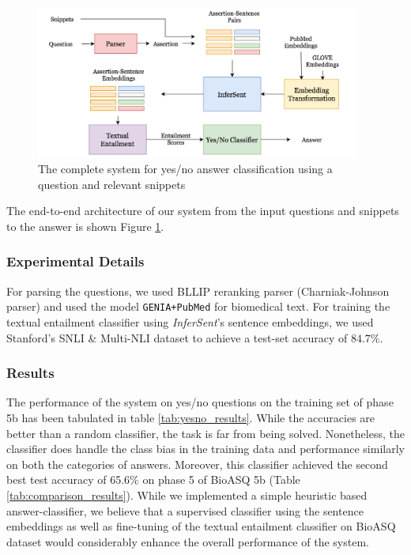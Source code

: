 \begin{figure}[t!]
    \centering
    \includegraphics[width=0.95\textwidth]{images/YesNoPipeline.png}
    \caption{The complete system for yes/no answer classification using a question and relevant snippets}
    \label{fig:yesno_pipeline}
\end{figure}

The end-to-end architecture of our system from the input questions and snippets to the answer is shown Figure \ref{fig:yesno_pipeline}.

\subsubsection{Experimental Details}

For parsing the questions, we used BLLIP reranking parser \cite{charniak_new1} (Charniak-Johnson parser) %
and used the model \texttt{GENIA+PubMed} for biomedical text. For training the textual entailment classifier using \textit{InferSent}'s sentence embeddings, we used Stanford's SNLI \& Multi-NLI dataset \cite{snli} to achieve a test-set accuracy of $84.7 \%$.

\subsubsection{Results}

The performance of the system on yes/no questions on the training set of phase 5b has been tabulated in table \ref{tab:yesno_results}. While the accuracies are better than a random classifier, the task is far from being solved. Nonetheless, the classifier does handle the class bias in the training data and performance similarly on both the categories of answers. Moreover, this classifier achieved the second best test accuracy of 65.6\% on phase 5 of BioASQ 5b (Table \ref{tab:comparison_results}). While we implemented a simple heuristic based answer-classifier, we believe that a supervised classifier using the sentence embeddings as well as fine-tuning of the textual entailment classifier on BioASQ dataset would considerably enhance the overall performance of the system.

